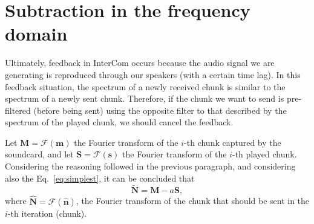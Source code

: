 
\section{Subtraction in the frequency domain}
Ultimately, feedback in InterCom occurs because the audio signal we
are generating is reproduced through our speakers (with a certain time
lag). In this feedback situation, the spectrum of a newly received
chunk is similar to the spectrum of a newly sent chunk. Therefore, if
the chunk we want to send is pre-filtered (before being sent) using
the opposite filter to that described by the spectrum of the played
chunk, we should cancel the feedback.

Let ${\mathbf M} = {\mathcal F}({\mathbf m})$ the Fourier transform of
the $i$-th chunk captured by the soundcard, and let
${\mathbf S} = {\mathcal F}({\mathbf s})$ the Fourier transform of the
$i$-th played chunk. Considering the reasoning followed in the
previous paragraph, and considering also the Eq.~\eqref{eq:simplest}, it can be concluded that
\begin{equation}
  \tilde{\mathbf N} = {\mathbf M} - a{\mathbf S},
  \label{eq:simplest_fourier}
\end{equation}
where $\hat{\mathbf{N}} = \mathcal{F}(\hat{\mathbf{n}})$, the Fourier
transform of the chunk that should be sent in the $i$-th iteration
(chunk).

